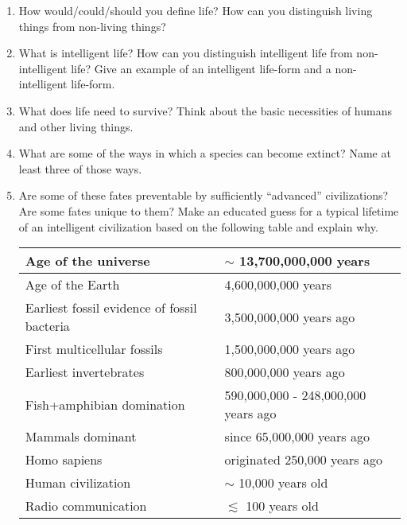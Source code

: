 \documentclass[10pt]{article}%
\begin{document}
\begin{enumerate}

\item How would/could/should you define life?  
How can you distinguish living things from non-living things?

\item  What is intelligent life?  
How can you distinguish intelligent life from non-intelligent life?  
Give an example of an intelligent life-form and a non-intelligent life-form. 

\item  What does life need to survive?  
Think about the basic necessities of humans and other living things.

\item What are some of the ways in which a species can become extinct?  Name at least three of those ways.  

\item Are some of these fates preventable by sufficiently ``advanced'' civilizations?  Are some fates unique to them?  
Make an educated guess for a typical lifetime of an intelligent civilization based on the following table and explain why.
\begin{center}
\begin{tabular}{|l|l|}
\hline
    Age of the universe & $\sim$ 13,700,000,000 years \\ \hline
    Age of the Earth & 4,600,000,000 years \\ \hline
    Earliest fossil evidence of fossil bacteria & 3,500,000,000 years ago \\ \hline
    First multicellular fossils & 1,500,000,000 years ago \\ \hline
    Earliest invertebrates & 800,000,000 years ago \\ \hline
    Fish+amphibian domination & 590,000,000 - 248,000,000 years ago \\ \hline
    Mammals dominant & since 65,000,000 years ago \\ \hline
    Homo sapiens & originated 250,000 years ago \\ \hline
    Human civilization & $\sim$ 10,000 years old \\ \hline
    Radio communication & $\lesssim$ 100 years old \\ \hline
\end{tabular}
\end{center}

\end{enumerate}
\end{document}
